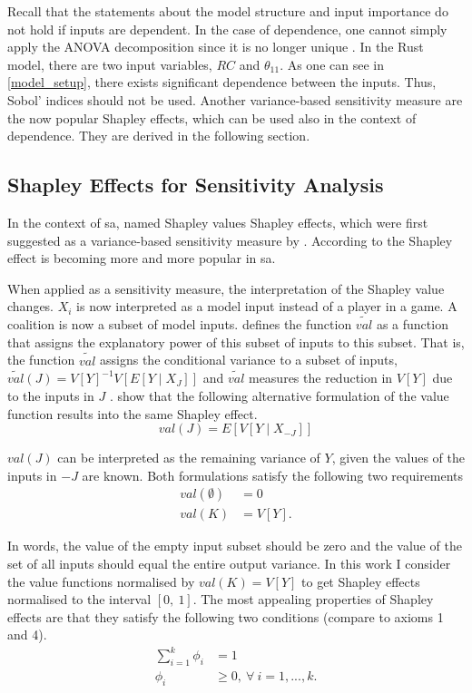 Recall that the statements about the model structure and input importance do not hold if inputs are dependent. In the case of dependence, one cannot simply apply the ANOVA decomposition since it is no longer unique \citep{O14}. In the Rust model, there are two input variables, $RC$ and $\theta_{11}$. As one can see in \cref{model_setup}, there exists significant dependence between the inputs. Thus, Sobol' indices should not be used. Another variance-based sensitivity measure are the now popular Shapley effects, which can be used also in the context of dependence. They are derived in the following section.

\subsection{Shapley Effects for Sensitivity Analysis}

In the context of sa, \citet{SNS16} named Shapley values Shapley effects, which were first suggested as a variance-based sensitivity measure by \citet{O14}. According to \citet{PRB20} the Shapley effect is becoming more and more popular in sa.

When applied as a sensitivity measure, the interpretation of the Shapley value changes. $X_i$ is now interpreted as a model input instead of a player in a game. A coalition is now a subset of model inputs. \citet{O14} defines the function $\widetilde{val}$ as a function that assigns the explanatory power of this subset of inputs to this subset. That is, the function $\widetilde{val}$ assigns the conditional variance to a subset of inputs, $\widetilde{val}(J)=V[Y]^{-1}V[E[Y \mid X_J]]$ and $\widetilde{val}$ measures the reduction in $V[Y]$ due to the inputs in $J$ \citep{SNS16}. \citep{SNS16} show that the following alternative formulation of the value function results into the same Shapley effect.
\begin{equation}
val(J)=E[V[Y \mid X_{- J}]]
\end{equation}

\noindent $val(J)$ can be interpreted as the remaining variance of $Y$, given the values of the inputs in $- J$ are known. Both formulations satisfy the following two requirements
\begin{align}
val(\emptyset)& = 0\\
val(K)& = V[Y].
\end{align}

\noindent In words, the value of the empty input subset should be zero and the value of the set of all inputs should equal the entire output variance. In this work I consider the value functions normalised by $val(K)=V[Y] $ to get Shapley effects normalised to the interval $ [0,\ 1] $. The most appealing properties of Shapley effects are that they satisfy the following two conditions (compare to axioms 1 and 4).
\begin{align}
\sum_{i=1}^{k}\phi_i& = 1\\
\phi_i& \geq 0,\ \forall \ i=1, ..., k.
\end{align}

